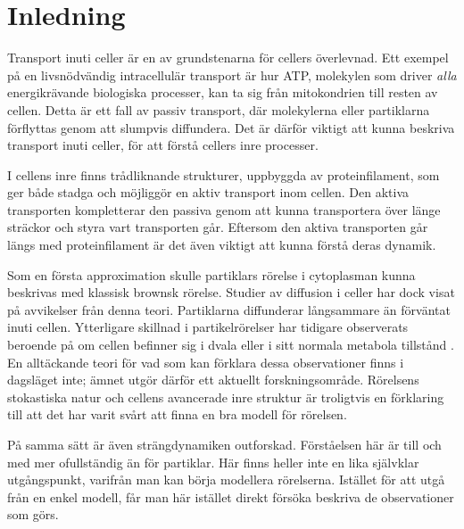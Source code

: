 \chapter{Inledning}



Transport inuti celler är en av grundstenarna för cellers överlevnad. Ett exempel på en livsnödvändig intracellulär transport är hur ATP, molekylen som driver \emph{alla} energikrävande biologiska processer, kan ta sig från mitokondrien till resten av cellen. Detta är ett fall av passiv transport, där molekylerna eller partiklarna förflyttas genom att slumpvis diffundera. Det är därför viktigt att kunna beskriva transport inuti celler, för att förstå cellers inre processer.

I cellens inre finns trådliknande strukturer, uppbyggda av proteinfilament, som ger både stadga och möjliggör en aktiv transport inom cellen. Den aktiva transporten kompletterar den passiva genom att kunna transportera över länge sträckor och styra vart transporten går. Eftersom den aktiva transporten går längs med proteinfilament är det även viktigt att kunna förstå deras dynamik.


Som en första approximation skulle partiklars rörelse i cytoplasman kunna beskrivas med klassisk brownsk rörelse. Studier av diffusion i celler \cite{Hofling&Franosch2013,Dix_Crowdingeffects2008,Gou_etal2014,Parry_etal2014} har dock visat på avvikelser från denna teori. Partiklarna diffunderar långsammare än förväntat inuti cellen. Ytterligare skillnad i partikelrörelser har tidigare observerats beroende på om cellen befinner sig i dvala eller i sitt normala metabola tillstånd \cite{Parry_etal2014,Midtveldt_etal2016}. En alltäckande teori för vad som kan förklara dessa observationer finns i dagsläget inte; ämnet utgör därför ett aktuellt forskningsområde. Rörelsens stokastiska natur och cellens avancerade inre struktur är troligtvis en förklaring till att det har varit svårt att finna en bra modell för rörelsen. 

På samma sätt är även strängdynamiken outforskad. Förståelsen här är till och med mer ofullständig än för partiklar\cite{Koster_etal2005,Koster_etal2007,Koster_etal2008}. Här finns heller inte en lika självklar utgångspunkt, varifrån man kan börja modellera rörelserna. Istället för att utgå från en enkel modell, får man här istället direkt försöka beskriva de observationer som görs.


